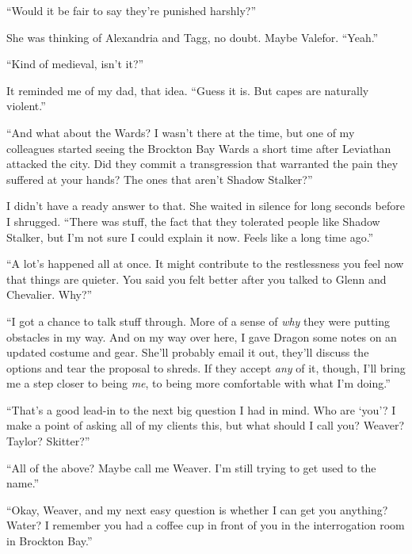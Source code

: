 ``Would it be fair to say they're punished harshly?''



She was thinking of Alexandria and Tagg, no doubt.  Maybe Valefor.  ``Yeah.''



``Kind of medieval, isn't it?''



It reminded me of my dad, that idea.  ``Guess it is.  But capes are naturally violent.''



``And what about the Wards?  I wasn't there at the time, but one of my colleagues started seeing the Brockton Bay Wards a short time after Leviathan attacked the city.  Did they commit a transgression that warranted the pain they suffered at your hands?  The ones that aren't Shadow Stalker?''



I didn't have a ready answer to that.  She waited in silence for long seconds before I shrugged.  ``There was stuff, the fact that they tolerated people like Shadow Stalker, but I'm not sure I could explain it now.  Feels like a long time ago.''



``A lot's happened all at once.  It might contribute to the restlessness you feel now that things are quieter.  You said you felt better after you talked to Glenn and Chevalier.  Why?''



``I got a chance to talk stuff through.  More of a sense of \emph{why} they were putting obstacles in my way.  And on my way over here, I gave Dragon some notes on an updated costume and gear.  She'll probably email it out, they'll discuss the options and tear the proposal to shreds.  If they accept \emph{any} of it, though, I'll bring me a step closer to being \emph{me}, to being more comfortable with what I'm doing.''



``That's a good lead-in to the next big question I had in mind.  Who are `you'?  I make a point of asking all of my clients this, but what should I call you?  Weaver?  Taylor?  Skitter?''



``All of the above?  Maybe call me Weaver.  I'm still trying to get used to the name.''



``Okay, Weaver, and my next easy question is whether I can get you anything?  Water?  I remember you had a coffee cup in front of you in the interrogation room in Brockton Bay.''



